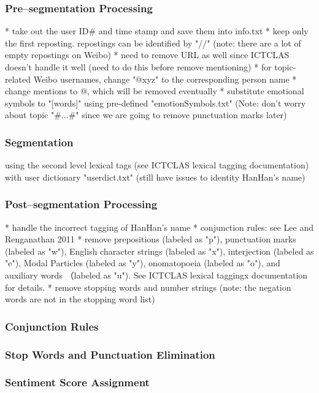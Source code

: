 \documentclass[11pt]{article}
\newcommand{\1}[1]{{\mathbf 1}\left\{#1\right\}}        %
\begin{document}
\subsubsection{Pre--segmentation Processing}

	* take out the user ID\# and time stamp and save them into info.txt
	* keep only the first reposting. repostings can be identified by "//" (note: there are a lot of empty repostings on Weibo)
	* need to remove URL as well since ICTCLAS doesn't handle it well (need to do this before remove mentioning)
	* for topic-related Weibo usernames, change "@xyz" to the corresponding person name
	* change mentions to @, which will be removed eventually
	* substitute emotional symbols to "[words]" using pre-defined "emotionSymbols.txt"
(Note: don't worry about topic "\#...\#" since we are going to remove punctuation marks later)

\subsubsection{Segmentation}
using the second level lexical tags (see ICTCLAS lexical tagging documentation)
with user dictionary "userdict.txt" (still have issues to identity HanHan's name)


\subsubsection{Post--segmentation Processing}
	* handle the incorrect tagging of HanHan's name
	* conjunction rules: see Lee and Renganathan 2011
	* remove prepositions (labeled as "p"), punctuation marks (labeled as "w"), English character strings (labeled as "x"), interjection (labeled as "e"), Modal Particles (labeled as "y"), onomatopoeia (labeled as "o"), and auxiliary words （labeled as "u"). See ICTCLAS lexical taggingx documentation for details.
	* remove stopping words and number strings (note: the negation words are not in the stopping word list)
	
\subsubsection{Conjunction Rules}

\subsubsection{Stop Words and Punctuation Elimination}

\subsubsection{Sentiment Score Assignment}
\end{document}
